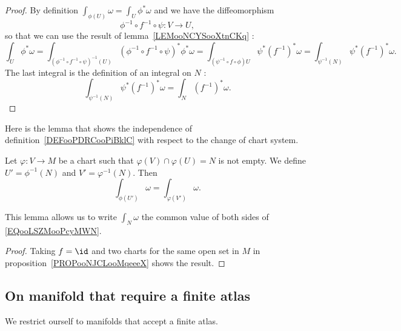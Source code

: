 \begin{proof}
	By definition \( \int_{\phi(U)}\omega=\int_U\phi^*\omega\) and we have the diffeomorphism
	\begin{equation}
		\phi^{-1}\circ f^{-1}\circ \psi\colon V\to U,
	\end{equation}
	so that we can use the result of lemma~\ref{LEMooNCYSooXtnCKq} :
	\begin{equation}
		\int_U\phi^*\omega=\int_{(\phi^{-1}\circ f^{-1}\circ \psi)^{-1}(U)}  (\phi^{-1}\circ f^{-1}\circ \psi)^*\phi^*\omega=\int_{(\psi^{-1}\circ f\circ \phi )U}\psi^*(f^{-1})^*\omega=\int_{\psi^{-1}(N)}\psi^*(f^{-1})^*\omega.
	\end{equation}
	The last integral is the definition of an integral on \( N\) :
	\begin{equation}
		\int_{\psi^{-1}(N)}\psi^*(f^{-1})^*\omega=\int_N(f^{-1})^*\omega.
	\end{equation}
\end{proof}

Here is the lemma that shows the independence of definition~\ref{DEFooPDRCooPiBklC} with respect to the change of chart system.
\begin{lemma}
	Let \( \varphi\colon V\to M\) be a chart such that \( \varphi(V)\cap \varphi(U)=N\) is not empty. We define \( U'=\phi^{-1}(N)\) and \( V'=\varphi^{-1}(N)\). Then
	\begin{equation}        \label{EQooLSZMooPcyMWN}
		\int_{\phi(U')}\omega=\int_{\varphi(V')}\omega.
	\end{equation}
\end{lemma}
This lemma allows us to write \( \int_N\omega\) the common value of both sides of \eqref{EQooLSZMooPcyMWN}.

\begin{proof}
	Taking \( f=\id\) and two charts for the same open set in \( M\) in proposition~\ref{PROPooNJCLooMqeeeX} shows the result.
\end{proof}

\subsection{On manifold that require a finite atlas}

We restrict ourself to manifolds that accept a finite atlas.

